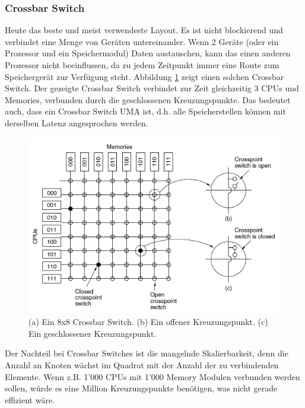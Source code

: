 \subsubsection{Crossbar Switch}
Heute das beste und meist verwendeste Layout. Es ist nicht blockierend und verbindet eine Menge von Geräten untereinander. Wenn 2 Geräte (oder ein Prozessor und ein Speichermodul) Daten austauschen, kann das einen anderen Prozessor nicht beeinflussen, da zu jedem Zeitpunkt immer eine Route zum Speichergerät zur Verfügung steht. Abbildung \ref{fig:crossbar_switch} zeigt einen solchen Crossbar Switch. Der gezeigte Crossbar Switch verbindet zur Zeit gleichzeitig 3 CPUs und Memories, verbunden durch die geschlossenen Kreuzungspunkte. Das bedeutet auch, dass ein Crossbar Switch UMA ist, d.h. alle Speicherstellen können mit derselben Latenz angesprochen werden.
\begin{figure}[h]
\centering
\includegraphics[width=0.7\linewidth]{fig/crossbar_switch}
\caption{(a) Ein 8x8 Crossbar Switch. (b) Ein offener Kreuzungspunkt. (c) Ein geschlossener Kreuzungspunkt.}
\label{fig:crossbar_switch}
\end{figure}

Der Nachteil bei Crossbar Switches ist die mangelnde Skalierbarkeit, denn die Anzahl an Knoten wächst im Quadrat mit der Anzahl der zu verbindenden Elemente. Wenn z.B. 1'000 CPUs mit 1'000 Memory Modulen verbunden werden sollen, würde es eine Million Kreuzungspunkte benötigen, was nicht gerade effizient wäre.

